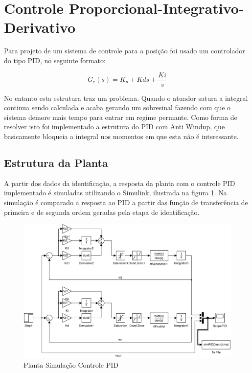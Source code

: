 \documentclass[a4paper,11pt]{article}
\begin{document}

\section{Controle Proporcional-Integrativo-Derivativo}


Para projeto de um sistema de controle para a posição foi usado um controlador do tipo PID, no seguinte formato:

\begin{equation}
    G_c(s) = K_p + Kd s + \frac{Ki}{s}
\end{equation}

No entanto esta estrutura traz um problema. Quando o atuador satura a integral continua sendo calculada e acaba gerando um sobresinal fazendo com que o sistema demore mais tempo para entrar em regime permante. Como forma de resolver isto foi implementado a estrutura do PID com Anti Windup, que basicamente bloqueia a integral nos momentos em que esta não é interessante.


\subsection{Estrutura da Planta}

A partir dos dados da identificação, a resposta da planta com o controle PID implementado é simuladas utilizando o Simulink, ilustrada na figura \ref{fig:pidControlPlant}. Na simulação é comparado a resposta ao PID a partir das função de transferência de primeira e de segunda ordem geradas pela etapa de identificação.

\begin{figure}[H]
    \centering
    \includegraphics[width=1.0\linewidth]{tex/img/dcMotorControl.pdf}
    \caption{Planta Simulação Controle PID}
    \label{fig:pidControlPlant}
\end{figure}
\end{document}
